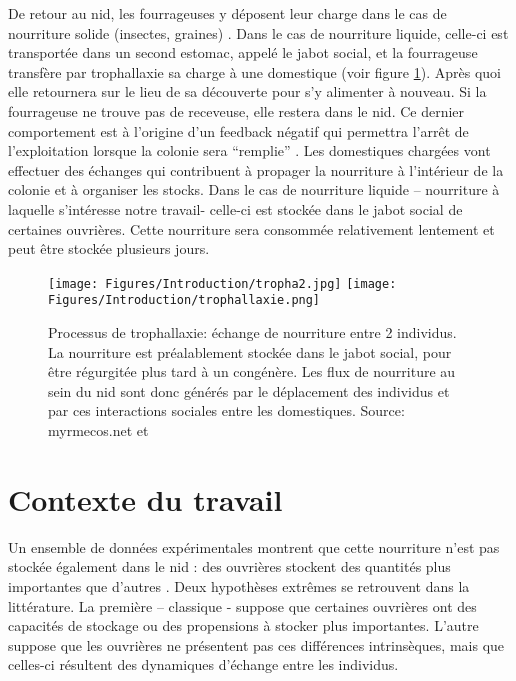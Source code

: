 De retour au nid, les fourrageuses y déposent leur charge dans le cas de nourriture solide (insectes, graines) \citep{reyes-lopez_food_2002}. Dans le cas de nourriture liquide, celle-ci est transportée dans un second estomac, appelé le jabot social, et la fourrageuse transfère par trophallaxie sa charge à une domestique (voir figure \ref{trophallaxie}). Après quoi elle retournera sur le lieu de sa découverte pour s'y alimenter à nouveau. Si la fourrageuse ne trouve pas de receveuse, elle restera dans le nid. Ce dernier comportement est à l'origine d'un feedback négatif qui permettra l'arrêt de l'exploitation lorsque la colonie sera ``remplie'' \citep{mailleux_impact_2010}. Les domestiques chargées vont effectuer des échanges qui contribuent à propager la nourriture à l'intérieur de la colonie et à organiser les stocks. Dans le cas de nourriture liquide – nourriture à laquelle s'intéresse notre travail- celle-ci est stockée dans le jabot social de certaines ouvrières. Cette nourriture sera consommée relativement lentement et peut être stockée plusieurs jours. \\

\begin{figure}[h]
\centering
\texttt{[image: Figures/Introduction/tropha2.jpg]}
\texttt{[image: Figures/Introduction/trophallaxie.png]}
\caption{Processus de trophallaxie: échange de nourriture entre 2 individus. La nourriture est préalablement stockée dans le jabot social, pour être régurgitée plus tard à un congénère. Les flux de nourriture au sein du nid sont donc générés par le déplacement des individus et par ces interactions sociales entre les domestiques.  Source: myrmecos.net et \citep{holldobler_ants_1990}}
\label{trophallaxie}
\end{figure}


\section{Contexte du travail}

Un ensemble de données expérimentales montrent que cette nourriture n'est pas stockée également dans le nid : des ouvrières stockent des quantités plus importantes que d'autres \citep{buffin_feeding_2009,buffin_collective_2012}. Deux hypothèses extrêmes se retrouvent dans la littérature. La première – classique - suppose que certaines ouvrières ont des capacités de stockage ou des propensions à stocker plus importantes. L'autre suppose que les ouvrières ne présentent pas ces différences intrinsèques, mais que celles-ci résultent des dynamiques d'échange entre les individus.\\

